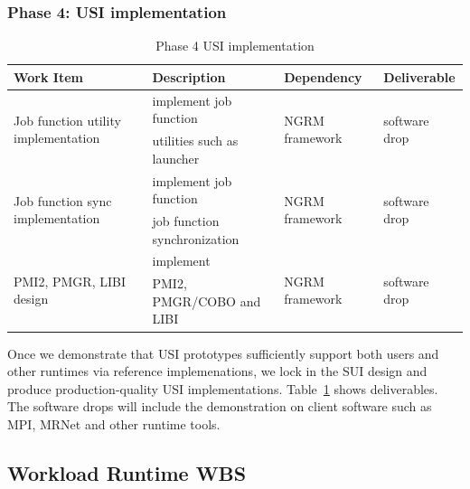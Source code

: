 \subsubsection{Phase 4: USI implementation}
\begin{table}
\centering
\begin{tabular}{|l|l|l|l|}
\hline
Work Item & Description & Dependency & Deliverable \\
\hline
\multirow{2}{*}{Job function utility implementation} & implement job function& \multirow{2}{*}{NGRM framework} & \multirow{2}{*}{software drop} \\
& utilities such as launcher & & \\ \hline
\multirow{2}{*}{Job function sync implementation} & implement job function& \multirow{2}{*}{NGRM framework} & \multirow{2}{*}{software drop} \\
& job function synchronization & & \\ \hline
\multirow{2}{*}{PMI2, PMGR, LIBI design} & implement & \multirow{2}{*}{NGRM framework} & \multirow{2}{*}{software drop} \\
& PMI2, PMGR/COBO and LIBI & & \\ \hline
\end{tabular}
\caption{Phase 4 USI implementation}
\label{tab:phase4}
\end{table}

Once we demonstrate that USI prototypes sufficiently support both users and
other runtimes via reference implemenations, we lock in the SUI design and
produce production-quality USI implementations. Table~\ref{tab:phase4} shows
deliverables. The software drops will include the demonstration on client
software such as MPI, MRNet and other runtime tools.


\newpage
\subsection{Workload Runtime WBS}

